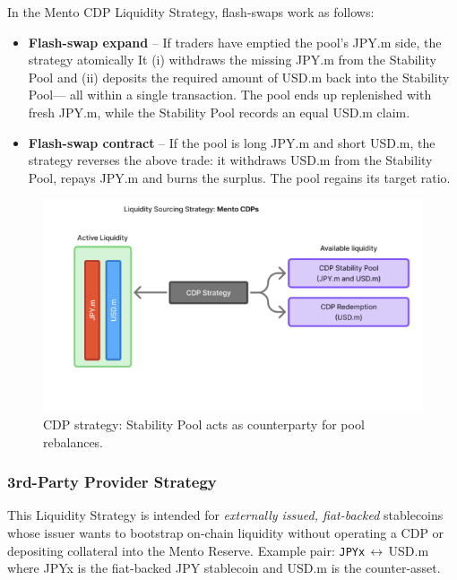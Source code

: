 \documentclass[a4paper]{article}
\providecommand{\hyp}{-}
\theoremstyle{definition}
\begin{document}
In the Mento CDP Liquidity Strategy, flash-swaps work as follows:
\begin{itemize}
  \item \textbf{Flash\hyp swap expand} – If traders have emptied the
        pool's JPY.m side, the strategy atomically 
        It (i) withdraws the missing JPY.m from the Stability Pool and (ii)
        deposits the required amount of USD.m back into the Stability Pool—
        all within a single transaction.
        The pool ends up replenished with fresh JPY.m, while the Stability Pool
        records an equal USD.m claim.
  \item \textbf{Flash\hyp swap contract} – If the pool is long JPY.m and
        short USD.m, the strategy reverses the above trade: it withdraws USD.m
        from the Stability Pool, repays JPY.m and burns the surplus.  The pool
        regains its target ratio.
\end{itemize}
\begin{figure}[ht]
    \centering
    \includegraphics[width=0.6\linewidth]{figures/fpmm_1.png}
    \caption{CDP strategy: Stability Pool acts as counterparty for pool rebalances.}
\end{figure}

\subsubsection{3rd\hyp Party Provider Strategy}\label{str:external}
This Liquidity Strategy is intended for \emph{externally issued, fiat-backed}
stablecoins whose issuer wants to bootstrap on-chain liquidity without
operating a CDP or depositing collateral into the Mento Reserve.  Example pair:
\texttt{JPYx}\,$\leftrightarrow$\,USD.m where JPYx is the fiat-backed JPY
stablecoin and USD.m is the counter-asset.\\
\end{document}
